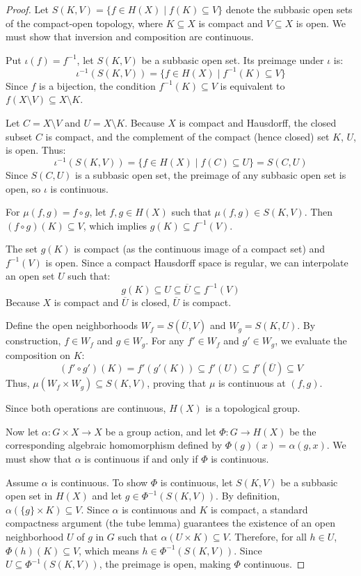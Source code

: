 \begin{proof}
    Let $S(K, V) = \{f \in H(X) \mid f(K) \subseteq V\}$ denote the subbasic open sets of the compact-open topology, where $K \subseteq X$ is compact and $V \subseteq X$ is open. We must show that inversion and composition are continuous.

    Put $\iota(f) = f^{-1}$,
    let $S(K, V)$ be a subbasic open set. Its preimage under $\iota$ is:
    $$ \iota^{-1}(S(K, V)) = \{f \in H(X) \mid f^{-1}(K) \subseteq V\} $$
    Since $f$ is a bijection, the condition $f^{-1}(K) \subseteq V$ is equivalent to $f(X \setminus V) \subseteq X \setminus K$.

    Let $C = X \setminus V$ and $U = X \setminus K$. Because $X$ is compact and Hausdorff, the closed subset $C$ is compact, and the complement of the compact (hence closed) set $K$, $U$, is open. Thus:
    $$ \iota^{-1}(S(K, V)) = \{f \in H(X) \mid f(C) \subseteq U\} = S(C, U) $$
    Since $S(C, U)$ is a subbasic open set, the preimage of any subbasic open set is open, so $\iota$ is continuous.

    For $\mu(f, g) = f \circ g$,
    let $f, g \in H(X)$ such that $\mu(f, g) \in S(K, V)$. Then $(f \circ g)(K) \subseteq V$, which implies $g(K) \subseteq f^{-1}(V)$.

    The set $g(K)$ is compact (as the continuous image of a compact set) and $f^{-1}(V)$ is open. Since a compact Hausdorff space is regular, we can interpolate an open set $U$ such that:
    $$ g(K) \subseteq U \subseteq \overline{U} \subseteq f^{-1}(V) $$
    Because $X$ is compact and $\overline{U}$ is closed, $\overline{U}$ is compact.

    Define the open neighborhoods $W_f = S(\overline{U}, V)$ and $W_g = S(K, U)$. By construction, $f \in W_f$ and $g \in W_g$.
    For any $f' \in W_f$ and $g' \in W_g$, we evaluate the composition on $K$:
    $$ (f' \circ g')(K) = f'(g'(K)) \subseteq f'(U) \subseteq f'(\overline{U}) \subseteq V $$
    Thus, $\mu(W_f \times W_g) \subseteq S(K, V)$, proving that $\mu$ is continuous at $(f,g)$.

    Since both operations are continuous, $H(X)$ is a topological group.



    Now let $\alpha: G \times X \to X$ be a group action, and let $\Phi: G \to H(X)$ be the corresponding algebraic homomorphism defined by $\Phi(g)(x) = \alpha(g, x)$. We must show that $\alpha$ is continuous if and only if $\Phi$ is continuous.

    Assume $\alpha$ is continuous. To show $\Phi$ is continuous, let $S(K, V)$ be a subbasic open set in $H(X)$ and let $g \in \Phi^{-1}(S(K, V))$. By definition, $\alpha(\{g\} \times K) \subseteq V$.
    Since $\alpha$ is continuous and $K$ is compact, a standard compactness argument (the tube lemma) guarantees the existence of an open neighborhood $U$ of $g$ in $G$ such that $\alpha(U \times K) \subseteq V$.
    Therefore, for all $h \in U$, $\Phi(h)(K) \subseteq V$, which means $h \in \Phi^{-1}(S(K, V))$. Since $U \subseteq \Phi^{-1}(S(K, V))$, the preimage is open, making $\Phi$ continuous.


\end{proof}
